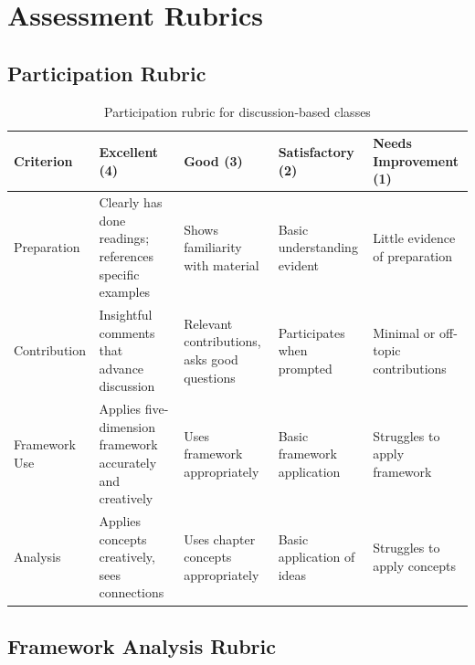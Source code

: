 \section{Assessment Rubrics}

\subsection{Participation Rubric}

\begin{table}[htbp]
\caption{Participation rubric for discussion-based classes}
\label{tab:participation-rubric}
\centering
\begin{tabular}{@{}p{2.5cm}p{2.5cm}p{2.5cm}p{2.5cm}p{2.5cm}@{}}
\toprule
\textbf{Criterion} & \textbf{Excellent (4)} & \textbf{Good (3)} & \textbf{Satisfactory (2)} & \textbf{Needs Improvement (1)} \\
\midrule
Preparation & Clearly has done readings; references specific examples & Shows familiarity with material & Basic understanding evident & Little evidence of preparation \\
Contribution & Insightful comments that advance discussion & Relevant contributions, asks good questions & Participates when prompted & Minimal or off-topic contributions \\
Framework Use & Applies five-dimension framework accurately and creatively & Uses framework appropriately & Basic framework application & Struggles to apply framework \\
Analysis & Applies concepts creatively, sees connections & Uses chapter concepts appropriately & Basic application of ideas & Struggles to apply concepts \\
\bottomrule
\end{tabular}
\end{table}

\subsection{Framework Analysis Rubric}

